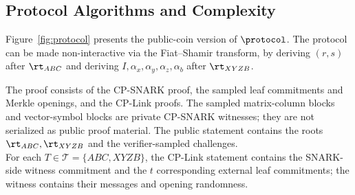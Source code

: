 


\subsection{Protocol Algorithms and Complexity}
\label{sec:protocol-complexity}
Figure~\ref{fig:protocol} presents the public-coin version of
\(\protocol\).  The protocol can be made non-interactive via the
Fiat--Shamir transform, by deriving \((r,s)\) after \(\rt_{ABC}\) and deriving
\(I,\alpha_x,\alpha_y,\alpha_z,\alpha_b\) after \(\rt_{XYZB}\).

The proof consists of the CP-SNARK proof, the sampled leaf commitments and
Merkle openings, and the CP-Link proofs.  The sampled matrix-column blocks and
vector-symbol blocks are private CP-SNARK witnesses; they are not serialized as
public proof material.
The public statement contains the roots
\(\rt_{ABC},\rt_{XYZB}\) and the verifier-sampled challenges. \\

For each \(T\in\mathcal{T}=\{ABC,XYZB\}\), the CP-Link statement contains
the SNARK-side witness commitment and the \(t\) corresponding external leaf
commitments; the witness contains their messages and opening randomness.\\

